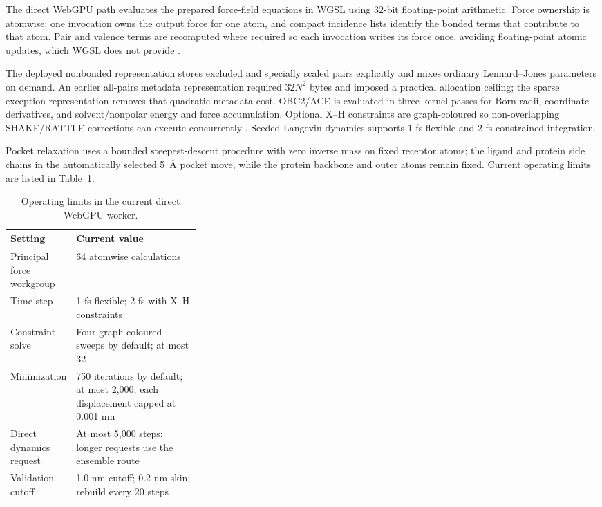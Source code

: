 \documentclass[11pt]{article}
\begin{document}
\begin{small}
The direct WebGPU path evaluates the prepared force-field equations in WGSL using 32-bit floating-point arithmetic. Force ownership is atomwise: one invocation owns the output force for one atom, and compact incidence lists identify the bonded terms that contribute to that atom. Pair and valence terms are recomputed where required so each invocation writes its force once, avoiding floating-point atomic updates, which WGSL does not provide \citep{webgpuWGSL2026}.

The deployed nonbonded representation stores excluded and specially scaled pairs explicitly and mixes ordinary Lennard--Jones parameters on demand. An earlier all-pairs metadata representation required $32N^2$ bytes and imposed a practical allocation ceiling; the sparse exception representation removes that quadratic metadata cost. OBC2/ACE is evaluated in three kernel passes for Born radii, coordinate derivatives, and solvent/nonpolar energy and force accumulation. Optional X--H constraints are graph-coloured so non-overlapping SHAKE/RATTLE corrections can execute concurrently \citep{ryckaert1977shake,andersen1983rattle}. Seeded Langevin dynamics supports 1 fs flexible and 2 fs constrained integration.

Pocket relaxation uses a bounded steepest-descent procedure with zero inverse mass on fixed receptor atoms; the ligand and protein side chains in the automatically selected 5~\AA{} pocket move, while the protein backbone and outer atoms remain fixed. Current operating limits are listed in Table~\ref{tab:appA_webgpu_limits}.

\begin{table}[htbp]
\centering\small
\caption{Operating limits in the current direct WebGPU worker.}
\label{tab:appA_webgpu_limits}
\begin{tabularx}{0.95\linewidth}{@{}p{0.32\linewidth}X@{}}
\toprule
\textbf{Setting} & \textbf{Current value}\\
\midrule
Principal force workgroup & 64 atomwise calculations\\
Time step & 1 fs flexible; 2 fs with X--H constraints\\
Constraint solve & Four graph-coloured sweeps by default; at most 32\\
Minimization & 750 iterations by default; at most 2,000; each displacement capped at 0.001 nm\\
Direct dynamics request & At most 5,000 steps; longer requests use the ensemble route\\
Validation cutoff & 1.0 nm cutoff; 0.2 nm skin; rebuild every 20 steps\\
\bottomrule
\end{tabularx}
\end{table}


\end{small}
\end{document}
